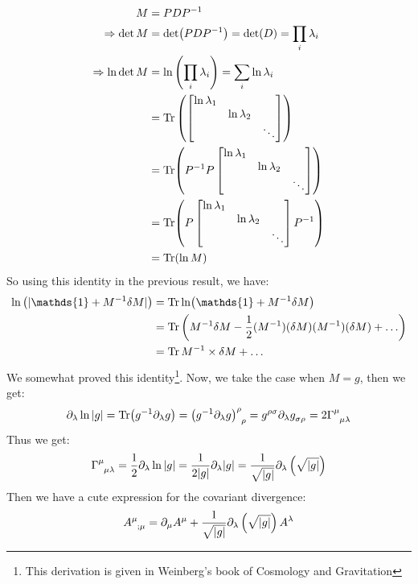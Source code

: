 \begin{align*}
M &= P D P^{-1}  \\
\Rightarrow \det M &= \det(P D P^{-1}) = \det(D) = \prod_i \lambda_i \\
\Rightarrow \ln \det M &= \ln \left( \prod_i \lambda_i \right) = \sum_i \ln \lambda_i \\
&= \Tr \left( \begin{bmatrix}
\ln \lambda_1 & & \\
& \ln \lambda_2 & \\
& & \ddots
\end{bmatrix} \right) \\
&= \Tr(P^{-1} P \begin{bmatrix}
\ln \lambda_1 & & \\
& \ln \lambda_2 & \\
& & \ddots
\end{bmatrix}) \\
&= \Tr(P \begin{bmatrix}
\ln \lambda_1 & & \\
& \ln \lambda_2 & \\
& & \ddots
\end{bmatrix} P^{-1}) \\
&= \Tr(\ln M)
\end{align*}
So using this identity in the previous result, we have:
\begin{align*}
    \ln \brac{|\mathds{1}+  M^{-1}\delta M|} &= \Tr\ln (\mathds{1}+  M^{-1}\delta M)\\
    &= \Tr\brac{M^{-1}\delta M - \frac{1}{2}{(M^{-1})(\delta M)(M^{-1})(\delta M)}+\ldots}\\
    &=  \Tr M^{-1}\times \delta M  + \ldots
\end{align*}
We somewhat proved this identity\footnote{This derivation is given in Weinberg's book of Cosmology and Gravitation}. Now, we take the case when $M= g$, then we get:
\begin{align*}
   \partial_\lambda \ln |g| =  \Tr(g^{-1}\partial_\lambda g) =\tensor{{\brac{g^{-1}\partial_\lambda g}}}{^\rho _\rho}= \tensor{{g}}{^\rho ^\sigma}\partial_\lambda \tensor{g}{_\sigma _\rho}=2\tensor{\Gamma}{^\mu _\mu _\lambda}
\end{align*}
Thus we get:
$$\tensor{\Gamma}{^\mu _\mu _\lambda} = \frac{1}{2}\partial_\lambda \ln |g|= \frac{1}{2|g|}\partial_\lambda |g|= \frac{1}{\sqrt{|g|}}\partial_\lambda \brac{\sqrt{|g|}}$$
Then we have a cute expression for the covariant divergence:
$$\tensor{A}{^\mu _{; \mu}} = \partial_\mu A^\mu + \frac{1}{\sqrt{|g|}}\partial_\lambda \brac{\sqrt{|g|}}A^\lambda$$
